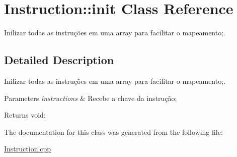 \hypertarget{class_instruction_1_1init}{}\section{Instruction\+:\+:init Class Reference}
\label{class_instruction_1_1init}


Inilizar todas as instruções em uma array para facilitar o mapeamento;.  




\subsection{Detailed Description}
Inilizar todas as instruções em uma array para facilitar o mapeamento;. 


\begin{DoxyParams}{Parameters}
{\em instructions} & Recebe a chave da instrução; \\
\hline
\end{DoxyParams}
\begin{DoxyReturn}{Returns}
void; 
\end{DoxyReturn}


The documentation for this class was generated from the following file\+:\begin{DoxyCompactItemize}
\item 
\hyperlink{_instruction_8cpp}{Instruction.\+cpp}\end{DoxyCompactItemize}
